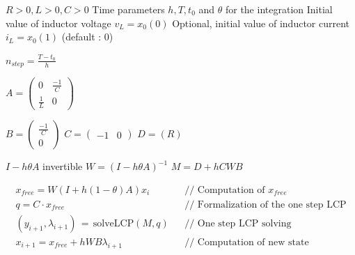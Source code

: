 \documentclass[10pt]{article}
\begin{document}
\begin{algorithm}
\caption{Integration of the electrical oscillator with half-wave rectifier through a fixed Moreau time stepping scheme}
\begin{algorithmic}

\REQUIRE $R > 0 , L > 0 , C > 0$
\REQUIRE Time parameters $h,T,t_0$ and $\theta$ for the integration
\REQUIRE Initial value of inductor voltage $v_L = x_0(0)$
\REQUIRE Optional, initial value  of inductor current $i_L = x_0(1)$ (default : 0)

\STATE $n_{step} = \frac{T - t_0}{h}$

\STATE $A = \left( \begin{array}{cc}
0 & \frac{-1}{C}\\
\frac{1}{L} & 0
\end{array} \right)$

\STATE $B = \left( \begin{array}{c}
\frac{-1}{C}\\
 0
\end{array} \right)$
\STATE $C = \left( \begin{array}{cc}
-1 & 0
\end{array} \right)$
\STATE $D = (R)$

\REQUIRE $I - h \theta A$ invertible
\STATE $W = (I - h \theta A)^{-1}$
\STATE $M = D + h C W B$

\STATE \begin{eqnarray*}
x_{free} = W (I + h (1 - \theta) A) x_i && \textrm{// Computation of $x_{free}$} \\
q = C \cdot x_{free} &&  \textrm{// Formalization of the one step LCP} \\
(y_{i+1},\lambda_{i+1})\,=\,\textrm{solveLCP}(M,q) &&  \textrm{// One step LCP solving} \\
x_{i+1} = x_{free} + h W B \lambda_{i+1} &&  \textrm{// Computation of new state}
\end{eqnarray*}
\ENDFOR

\end{algorithmic}
\end{algorithm}
\end{document}
